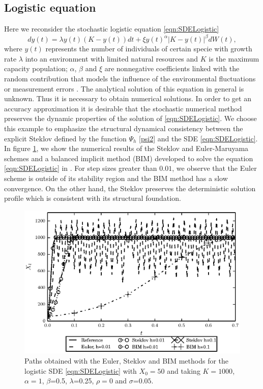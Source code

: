	\subsection{Logistic equation}
		Here we reconsider the stochastic logistic  equation \eqref{eqn:SDELogistic}
		\begin{equation*}
			dy(t)= \lambda y(t)(K-y(t))dt+ \xi y(t)^\alpha|K-y(t)|^\beta dW(t),
		\end{equation*}
		where $y(t)$  represents the number of individuals of certain specie with growth rate
		$\lambda$ into an environment with limited  natural resources and $K$ is the maximum
		capacity population; $\alpha$, $\beta$ and $\xi$ are nonnegative coefficients linked
		with the random contribution that models the influence of the environmental fluctuations
		or measurement errors \cite{Pasquali2001,Schurz2007,Sun2008}. The analytical solution of
		this equation in general is unknown. Thus it is necessary to obtain  numerical
		solutions. In order to get an accuracy approximation it is desirable that the stochastic
		numerical method  preserves the dynamic properties of the solution of
		\eqref{eqn:SDELogistic}. We choose this example to emphasize the structural dynamical
		consistency between the explicit Steklov defined by the function $\Psi_h$ \eqref{psi2}
		and the SDE \eqref{eqn:SDELogistic}. In figure \ref{fig:PathsEDELog}, we  
		show the numerical results of the  Steklov and Euler-Maruyama schemes and a
		balanced implicit method (BIM) developed to solve the equation \eqref{eqn:SDELogistic} in 
		\cite{Schurz2007}. For step sizes greater than $\num{0.01}$,
		we observe that the Euler scheme is outside of its stability region and the BIM method has
		a slow convergence. On the other hand,
		the Steklov preserves the deterministic solution profile which is consistent with its
		structural foundation.
		\begin{figure}[h!]
			\hspace*{-0.2cm}\includegraphics{./papers/paperA/figures/fig1.eps}
			\caption{
			Paths obtained with the Euler, Steklov and BIM methods for the logistic SDE 
			\eqref{eqn:SDELogistic} with $X_0=50$ and taking $K=1000$,
			$\alpha=1$, $\beta$=0.5, $\lambda$=0.25, $\rho=0$ and $\sigma$=$\num{0.05}$.%
			}\label{fig:PathsEDELog}%
		\end{figure}
